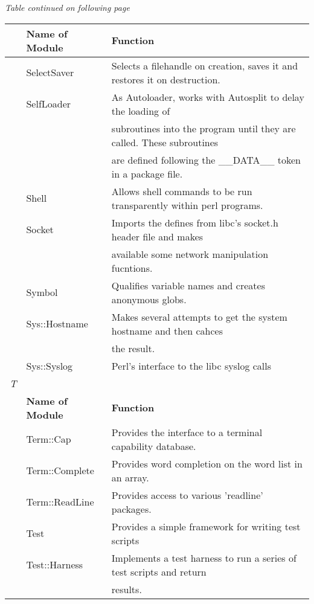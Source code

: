 \documentclass[a4paper,11pt]{book}
\begin{document}
\noindent \textit{Table continued on following page}

\noindent 

\noindent 

\begin{tabular}{|p{0.2in}|p{1.0in}|p{2.9in}|} \hline 
 & \textbf{Name of Module} & \textbf{Function} \\ \hline 
 & SelectSaver & Selects a filehandle on creation, saves it and restores it on destruction. \\ \hline 
 & SelfLoader & As Autoloader, works with Autosplit to delay the loading of \\ \hline 
 &  & subroutines into the program until they are called. These subroutines \\ \hline 
 &  & are defined following the \_\_DATA\_\_ token in a package file. \\ \hline 
 & Shell & Allows shell commands to be run transparently within perl programs. \\ \hline 
 & Socket & Imports the defines from libc's socket.h header file and makes \\ \hline 
 &  & available some network manipulation fucntions. \\ \hline 
 & Symbol & Qualifies variable names and creates anonymous globs. \\ \hline 
 & Sys::Hostname & Makes several attempts to get the system hostname and then cahces \\ \hline 
 &  & the result. \\ \hline 
 & Sys::Syslog & Perl's interface to the libc syslog calls \\ \hline 
\newline \textit{T} &  &  \\ \hline 
 & \textbf{Name of Module} & \textbf{Function} \\ \hline 
 & Term::Cap & Provides the interface to a terminal capability database. \\ \hline 
 & Term::Complete & Provides word completion on the word list in an array. \\ \hline 
 & Term::ReadLine & Provides access to various 'readline' packages. \\ \hline 
 & Test & Provides a simple framework for writing test scripts \\ \hline 
 & Test::Harness & Implements a test harness to run a series of test scripts and return \\ \hline 
 &  & results. \\ \hline 

\end{tabular}
\end{document}
